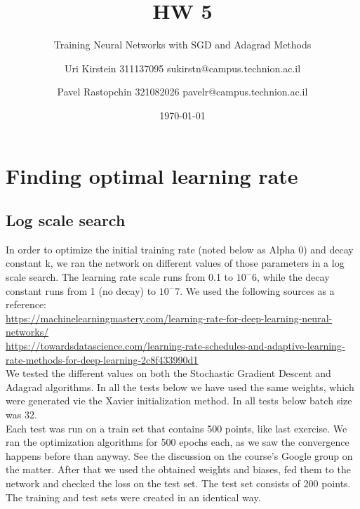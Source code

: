 \documentclass[12pt]{scrartcl}
\begin{document}

\titlehead{CS department, Technion}
\subject{Introduction to Optimization and Deep Learning 236330}
\title{HW 5}
\subtitle{Training Neural Networks with SGD and Adagrad Methods}
\author{Uri Kirstein 311137095 \hfill sukirstn@campus.technion.ac.il\and Pavel Rastopchin 321082026 pavelr@campus.technion.ac.il}
\date{\today}
\maketitle


\section{Finding optimal learning rate}
\subsection{Log scale search}
In order to optimize the initial training rate (noted below as Alpha 0) and decay constant k, we ran the network on different values of those parameters in a log scale search. The learning rate scale runs from 0.1 to $10^-6$, while the decay constant runs from 1 (no decay) to $10^-7$. We used the following sources as a reference:\\
\url{https://machinelearningmastery.com/learning-rate-for-deep-learning-neural-networks/}\\
\url{https://towardsdatascience.com/learning-rate-schedules-and-adaptive-learning-rate-methods-for-deep-learning-2c8f433990d1}\\
We tested the different values on both the Stochastic Gradient Descent and Adagrad algorithms. In all the tests below we have used the same weights, which were generated vie the Xavier initialization method. In all tests below batch size was 32.\\
Each test was run on a train set that contains 500 points, like last exercise. We ran the optimization algorithms for 500 epochs each, as we saw the convergence happens before than anyway. See the discussion on the course's Google group on the matter. After that we used the obtained weights and biases, fed them to the network and checked the loss on the test set. The test set consists of 200 points. The training and test sets were created in an identical way.


\end{document}
